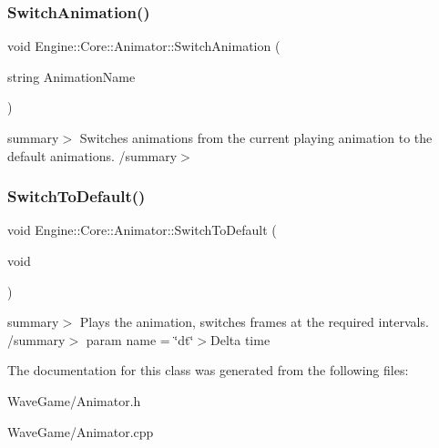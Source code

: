 \subsubsection{\texorpdfstring{Switch\+Animation()}{SwitchAnimation()}}
{\footnotesize\ttfamily void Engine\+::\+Core\+::\+Animator\+::\+Switch\+Animation (\begin{DoxyParamCaption}\item[{string}]{Animation\+Name }\end{DoxyParamCaption})}

summary$>$ Switches animations from the current playing animation to the default animations. /summary$>$ \mbox{\label{class_engine_1_1_core_1_1_animator_a9d81dd25418ebaf1bcae5f88ac879f56}} 
\subsubsection{\texorpdfstring{Switch\+To\+Default()}{SwitchToDefault()}}
{\footnotesize\ttfamily void Engine\+::\+Core\+::\+Animator\+::\+Switch\+To\+Default (\begin{DoxyParamCaption}\item[{void}]{ }\end{DoxyParamCaption})}

summary$>$ Plays the animation, switches frames at the required intervals. /summary$>$ param name = \char`\"{}dt\char`\"{}$>$Delta time

The documentation for this class was generated from the following files\+:\begin{DoxyCompactItemize}
\item 
Wave\+Game/Animator.\+h\item 
Wave\+Game/Animator.\+cpp\end{DoxyCompactItemize}
